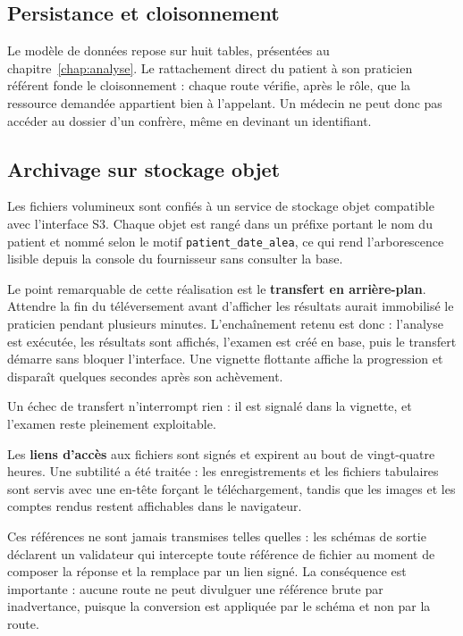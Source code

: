 \subsection{Persistance et cloisonnement}

Le modèle de données repose sur huit tables, présentées au chapitre~\ref{chap:analyse}. Le
rattachement direct du patient à son praticien référent fonde le cloisonnement : chaque route
vérifie, après le rôle, que la ressource demandée appartient bien à l'appelant. Un médecin ne
peut donc pas accéder au dossier d'un confrère, même en devinant un identifiant.

\subsection{Archivage sur stockage objet}

Les fichiers volumineux sont confiés à un service de stockage objet compatible avec
l'interface S3. Chaque objet est rangé dans un préfixe portant le nom du patient et nommé
selon le motif \texttt{patient\_date\_alea}, ce qui rend l'arborescence lisible depuis la
console du fournisseur sans consulter la base.

Le point remarquable de cette réalisation est le \textbf{transfert en arrière-plan}. Attendre
la fin du téléversement avant d'afficher les résultats aurait immobilisé le praticien pendant
plusieurs minutes. L'enchaînement retenu est donc : l'analyse est exécutée, les résultats sont
affichés, l'examen est créé en base, puis le transfert démarre sans bloquer l'interface. Une
vignette flottante affiche la progression et disparaît quelques secondes après son achèvement.

Un échec de transfert n'interrompt rien : il est signalé dans la vignette, et l'examen reste
pleinement exploitable.

Les \textbf{liens d'accès} aux fichiers sont signés et expirent au bout de vingt-quatre heures.
Une subtilité a été traitée : les enregistrements et les fichiers tabulaires sont servis avec
une en-tête forçant le téléchargement, tandis que les images et les comptes rendus restent
affichables dans le navigateur.

Ces références ne sont jamais transmises telles quelles : les schémas de sortie déclarent un
validateur qui intercepte toute référence de fichier au moment de composer la réponse et la
remplace par un lien signé. La conséquence est importante : aucune route ne peut divulguer une
référence brute par inadvertance, puisque la conversion est appliquée par le schéma et non par
la route.

